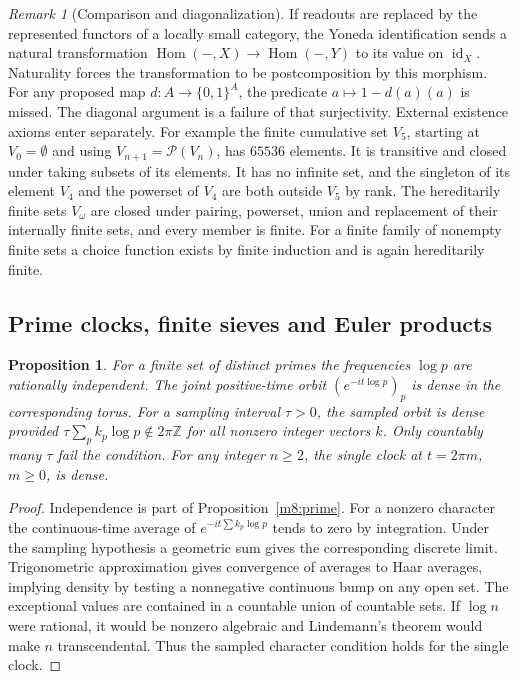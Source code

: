 \documentclass[11pt,reqno]{amsart}
\newtheorem{proposition}[theorem]{Proposition}
\theoremstyle{definition}
\theoremstyle{remark}
\newtheorem{remark}[theorem]{Remark}
\numberwithin{equation}{section}
\newcommand{\Z}{\mathbb{Z}}
\begin{document}
\begin{remark}[Comparison and diagonalization]\label{m9:diagonal}
If readouts are replaced by the represented functors of a locally
small category, the Yoneda identification sends a natural
transformation \(\operatorname{Hom}(-,X)\to\operatorname{Hom}(-,Y)\)
to its value on \(\operatorname{id}_X\). Naturality forces the
transformation to be postcomposition by this morphism.
For any proposed map \(d:A\to\{0,1\}^{A}\),
the predicate \(a\mapsto1-d(a)(a)\) is missed.
The diagonal argument is a failure of that surjectivity.
External existence axioms enter separately. For example the
finite cumulative set \(V_5\), starting at \(V_0=\emptyset\)
and using \(V_{n+1}=\mathcal P(V_n)\), has \(65536\) elements.
It is transitive and closed under taking subsets of its
elements. It has no infinite set, and the singleton of its
element \(V_4\) and the powerset of \(V_4\) are both outside
\(V_5\) by rank. The hereditarily finite sets \(V_\omega\)
are closed under pairing, powerset, union and replacement
of their internally finite sets, and every member is finite.
For a finite family of nonempty finite sets a choice function
exists by finite induction and is again hereditarily finite.
\end{remark}

\subsection{Prime clocks, finite sieves and Euler products}

\begin{proposition}\label{m9:clocks}
For a finite set of distinct primes the frequencies \(\log p\)
are rationally independent. The joint positive-time orbit
\((e^{-it\log p})_p\) is dense in the corresponding torus. For
a sampling interval \(\tau>0\), the sampled orbit is dense
provided \(\tau\sum_p k_p\log p\notin2\pi\Z\) for all nonzero
integer vectors \(k\). Only countably many \(\tau\) fail the
condition. For any integer \(n\ge2\), the single clock at
\(t=2\pi m\), \(m\ge0\), is dense.
\end{proposition}
\begin{proof}
Independence is part of Proposition~\ref{m8:prime}. For a nonzero character the continuous-time
average of \(e^{-it\sum k_p\log p}\) tends to zero by integration.
Under the sampling hypothesis a geometric sum gives the corresponding
discrete limit. Trigonometric approximation gives convergence of
averages to Haar averages, implying density by testing a nonnegative
continuous bump on any open set. The exceptional values are contained
in a countable union of countable sets. If \(\log n\) were rational,
it would be nonzero algebraic and Lindemann's theorem
\cite[Ch.~1]{m6:Baker} would make \(n\) transcendental. Thus the sampled
character condition holds for the single clock.
\end{proof}
\end{document}
